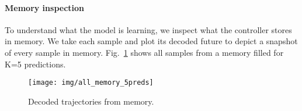 \documentclass[10pt,twocolumn,letterpaper]{article}
\begin{document}
\begin{table}[]
	\begin{center}
		\caption{Ablation study of the full method against variants without specific components: decoder, refinement, rotation invariance, trained controller, encoder-decoder. Errors are at K=5. Memory size is shown as number of samples and \% of the training set.}
		\label{tab:ablation}
	\end{center}
\end{table}

\paragraph{Memory inspection}
To understand what the model is learning, we inspect what the controller stores in memory. We take each sample and plot its decoded future to depict a snapshot of every sample in memory. Fig.~\ref{fig:all_memory} shows all samples from a memory filled for K=5 predictions.

\begin{figure}
	\vspace{-10px}
	\centering
	\texttt{[image: img/all\_memory\_5preds]}
	\caption{Decoded trajectories from memory. \label{fig:all_memory}}
\vspace{-15px}
\end{figure}
\end{document}
